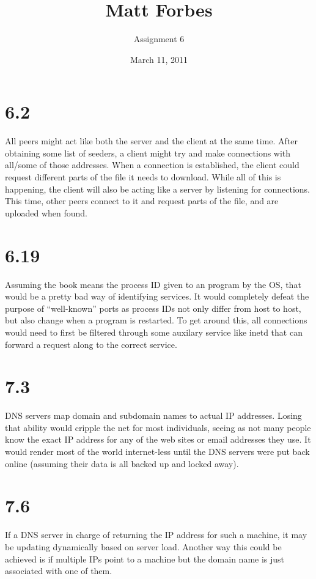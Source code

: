 \documentclass[a4paper,12pt]{article}
\begin{document}
\title{Matt Forbes}
\author{Assignment 6}
\date{March 11, 2011}
\maketitle

\section*{6.2}
All peers might act like both the server and the client at the same
time. After obtaining some list of seeders, a client might try and
make connections with all/some of those addresses. When a connection
is established, the client could request different parts of the file
it needs to download. While all of this is happening, the client will
also be acting like a server by listening for connections. This time,
other peers connect to it and request parts of the file, and are
uploaded when found. 

\section*{6.19}
Assuming the book means the process ID given to an program by the OS,
that would be a pretty bad way of identifying services. It would
completely defeat the purpose of ``well-known'' ports as process IDs
not only differ from host to host, but also change when a program is
restarted. To get around this, all connections would need to first be
filtered through some auxilary service like inetd that can forward a
request along to the correct service.

\section*{7.3}
DNS servers map domain and subdomain names to actual IP
addresses. Losing that ability would cripple the net for most
individuals, seeing as not many people know the exact IP address for
any of the web sites or email addresses they use. It would render most
of the world internet-less until the DNS servers were put back online
(assuming their data is all backed up and locked away).

\section*{7.6}
If a DNS server in charge of returning the IP address for such a
machine, it may be updating dynamically based on server load. Another
way this could be achieved is if multiple IPs point to a machine but
the domain name is just associated with one of them.
\end{document}
